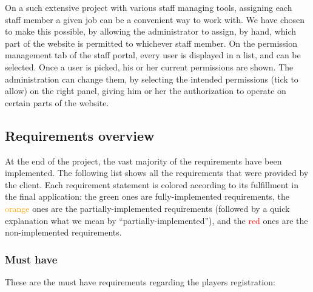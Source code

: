 
On a such extensive project with various staff managing tools, assigning
each staff member a given job can be a convenient way to work with. We have
chosen to make this possible, by allowing the administrator to assign, by hand,
which part of the website is permitted to whichever staff member.
On the permission management tab of the staff portal, every user is displayed
in a list, and can be selected. Once a user is picked, his or her current
permissions are shown. The administration can change them, by selecting
the intended permissions (tick to allow) on the right panel,
giving him or her the authorization to operate on certain parts of the website.

\subsection{Requirements overview}
\label{Requirements overview}

At the end of the project, the vast majority of the requirements have been
implemented. The following list shows all the requirements that were provided
by the client. Each requirement statement is colored according to its
fulfillment in the final application: the \textcolor{green!60!black}{green} ones are fully-implemented
requirements, the \textcolor{orange}{orange} ones are the partially-implemented requirements
(followed by a quick explanation what we mean by
\enquote{partially-implemented}), and the \textcolor{red}{red} ones are the non-implemented
requirements. \newline

\subsubsection{Must have}
\label{Must have}

These are the must have requirements regarding the players registration:\newline

